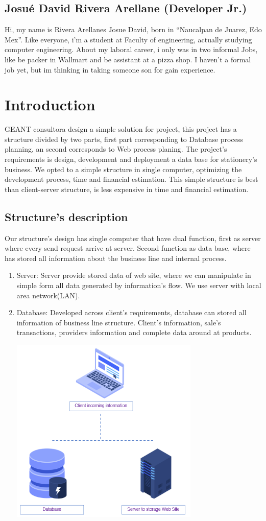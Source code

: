 \documentclass{article}
\begin{document}
\subsection{Josué David Rivera Arellane (Developer Jr.)}
Hi, my name is Rivera Arellanes Josue David, born in “Naucalpan de Juarez, Edo Mex”. Like everyone, i’m a student at Faculty of engineering, actually studying computer engineering. 
About my laboral career, i only was in two informal Jobs, like be packer in Wallmart and be assistant at a pizza shop. 
I haven’t a formal job yet, but im thinking in taking someone son for gain experience.
\newpage
\section{Introduction}
GEANT consultora design a simple solution for project, this project has a structure divided by two parts, first part corresponding to Database process planning, an second corresponds to Web process planing.
The project's requirements is design, development and deployment a data base for stationery's business. 
We opted to a simple structure in single computer, optimizing the development process, time and financial estimation. This simple structure is best than client-server structure, is less expensive in time and financial estimation.
\subsection{Structure's description}
Our structure's design has single computer that have dual function, first as server 		where every send request arrive at server. Second function as data base, where 		has stored all information about the business line and internal process.
\begin{enumerate}
\item Server: Server provide stored data of web site, where we can manipulate in simple form all data generated by information's flow. We use server with local area network(LAN).
\item Database: Developed across client's requirements, database can stored all information of business line structure. Client's information, sale's transactions, providers information and complete data around at products. 
\begin{center}
\includegraphics[width=9cm]{structured}
\end{center}
\end{enumerate}
\end{document}
